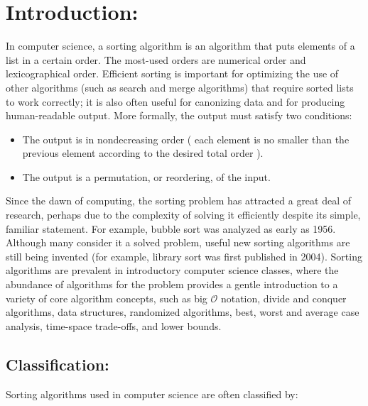 \section{Introduction:}

In computer science, a sorting algorithm is an algorithm that puts elements of a list in a certain order. The
most-used orders are numerical order and lexicographical order. Efficient sorting is important for optimizing the use of other algorithms (such as search and merge algorithms) that require sorted lists to work correctly; it is also often useful for canonizing data and for producing human-readable output. More formally, the output must satisfy two conditions: \hfill \break

\begin{itemize}
\item The output is in nondecreasing order ( each element is no smaller than the previous element according to the desired total order ).
\item The output is a permutation, or reordering, of the input.
\end{itemize} \hfill

Since the dawn of computing, the sorting problem has attracted a great deal of research, perhaps due to the
complexity of solving it efficiently despite its simple, familiar statement. For example, bubble sort was analyzed as
early as 1956. Although many consider it a solved problem, useful new sorting algorithms are still being invented
(for example, library sort was first published in 2004). Sorting algorithms are prevalent in introductory computer
science classes, where the abundance of algorithms for the problem provides a gentle introduction to a variety of
core algorithm concepts, such as big $\mathcal{O}$ notation, divide and conquer algorithms, data structures, randomized algorithms, best, worst and average case analysis, time-space trade-offs, and lower bounds. 

\subsection{Classification:}

Sorting algorithms used in computer science are often classified by:

